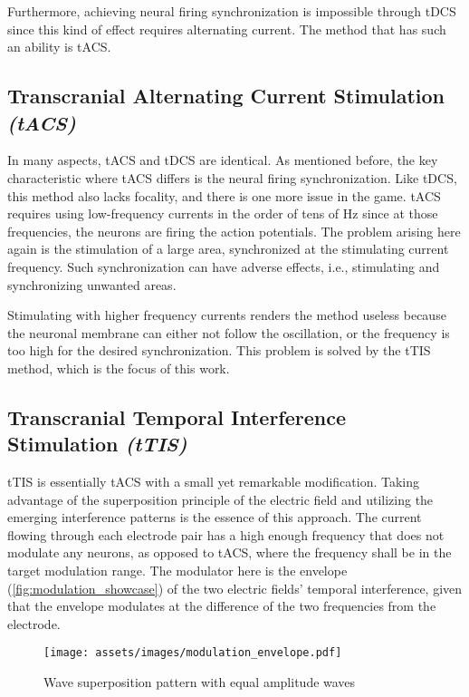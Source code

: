 Furthermore, achieving neural firing synchronization is impossible through \gls{tDCS} since this kind of effect requires alternating current. The method that has such an ability is \gls{tACS}.

\subsection{Transcranial Alternating Current Stimulation \textit{(tACS)}}

In many aspects, \gls{tACS} and \gls{tDCS} are identical. As mentioned before, the key characteristic where \gls{tACS} differs is the neural firing synchronization. Like \gls{tDCS}, this method also lacks focality, and there is one more issue in the game.
\gls{tACS} requires using low-frequency currents in the order of tens of Hz since at those frequencies, the neurons are firing the action potentials. The problem arising here again is the stimulation of a large area, synchronized at the stimulating current frequency. Such synchronization can have adverse effects, i.e., stimulating and synchronizing unwanted areas.

Stimulating with higher frequency currents renders the method useless because the neuronal membrane can either not follow the oscillation, or the frequency is too high for the desired synchronization. This problem is solved by the \gls{tTIS} method, which is the focus of this work.

\subsection{Transcranial Temporal Interference Stimulation \textit{(tTIS)}}

\gls{tTIS} is essentially \gls{tACS} with a small yet remarkable modification. Taking advantage of the superposition principle of the electric field and utilizing the emerging interference patterns is the essence of this approach. The current flowing through each electrode pair has a high enough frequency that does not modulate any neurons, as opposed to \gls{tACS}, where the frequency shall be in the target modulation range. The modulator here is the envelope (\autoref{fig:modulation_showcase}) of the two electric fields' temporal interference, given that the envelope modulates at the difference of the two frequencies from the electrode.
\begin{figure}[H]
    \centering
    \texttt{[image: assets/images/modulation\_envelope.pdf]}
    \caption{Wave superposition pattern with equal amplitude waves}
    \label{fig:modulation_showcase}
\end{figure}

